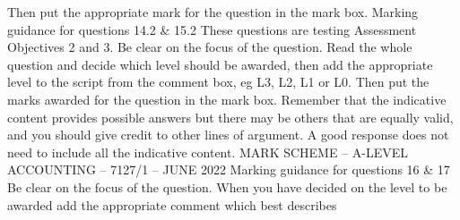 \documentclass{article}
\begin{document}
 \newline
Then put the appropriate mark for the question in the mark box. \newline
 \newline
 \newline
 \newline
Marking guidance for questions 14.2 \& 15.2 \newline
 \newline
These questions are testing Assessment Objectives 2 and 3. \newline
 \newline
Be clear on the focus of the question. \newline
 \newline
Read the whole question and decide which level should be awarded, then add the appropriate level to \newline
the script from the comment box, eg L3, L2, L1 or L0. \newline
 \newline
Then put the marks awarded for the question in the mark box. \newline
 \newline
Remember that the indicative content provides possible answers but there may be others that are \newline
equally valid, and you should give credit to other lines of argument. \newline
 \newline
A good response does not need to include all the indicative content. \newline
 \newline
 \newline
 \newline
 \newline
 \newline
 \newline
 \newline
 \newline
 \newline
 \newline
MARK SCHEME – A-LEVEL ACCOUNTING – 7127/1 – JUNE 2022  \newline
Marking guidance for questions 16 \& 17 \newline
 \newline
Be clear on the focus of the question. \newline
 \newline
When you have decided on the level to be awarded add the appropriate comment which best describes \newline
\end{document}
